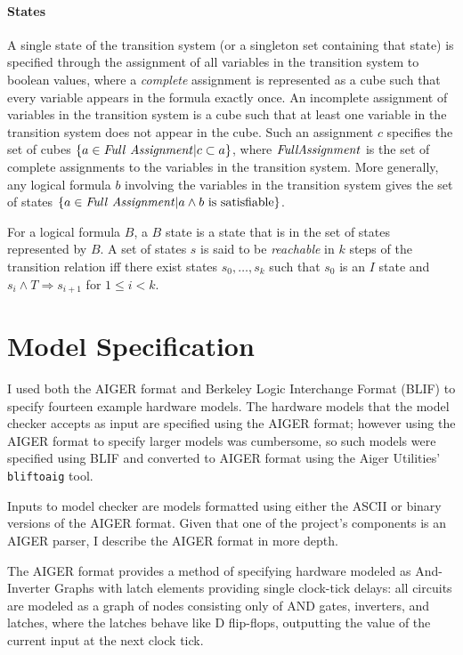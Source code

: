 \documentclass[12pt,a4paper,twoside,openright]{report}
\begin{document}
\paragraph{States}{
A single state of the transition system (or a singleton set containing that state)
is specified through the assignment of all variables in the transition system
to boolean values, where a \emph{complete} assignment is represented as a cube such
that every variable appears in the formula exactly once.
An incomplete assignment of variables in the transition system is a cube such that
at least one variable in the transition system does not appear in the cube. Such an
assignment $c$ specifies the set of cubes $\{a \in{\it Full~Assignment}|c \subset a\}$,
where ${\it Full Assignment}$ is the set of complete assignments to the variables in the
transition system.
More generally, any logical formula $b$ involving the variables in the transition
system gives the set of states
$\{a \in {\it Full~Assignment} | a \wedge b~{\rm is~satisfiable}\}$.

For a logical formula $B$, a $B$ state is a state that is in the set of states represented
by $B$. A set of states $s$ is said to be \emph{reachable}
in $k$ steps of the transition relation iff there exist states $s_0, \ldots, s_k$ such that
$s_0$ is an $I$ state and $s_i \wedge T \Rightarrow s_{i + 1}$ for $1 \leq i < k$.

}


\section{Model Specification}


I used both the AIGER format and Berkeley Logic Interchange Format (BLIF)
to specify fourteen example hardware models.
The hardware models that the model checker accepts as input
are specified using the AIGER format;
however using the AIGER format to specify larger models was cumbersome,
so such models were specified using BLIF and converted to AIGER format
using the Aiger Utilities' \verb,bliftoaig, tool.

Inputs to model checker are models formatted using either the ASCII or
binary versions of the AIGER format. Given that one of the project's
components is an AIGER parser, I describe the AIGER format in more
depth.

The AIGER format provides a method of specifying hardware modeled as
And-Inverter Graphs with latch elements providing single clock-tick
delays: all circuits are modeled as a graph of nodes consisting only of
AND gates, inverters, and latches, where the latches behave like D
flip-flops, outputting the value of the current input at the next
clock tick.
\end{document}

